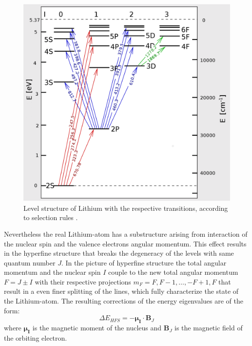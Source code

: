 \begin{figure}[H]
\begin{center}
\includegraphics[scale=.4] {levels2}
\end{center}
\caption{Level structure of Lithium with the respective transitions, according to selection rules \cite{transitions}.}
\label{levels2}
\end{figure}
Nevertheless the real Lithium-atom has a substructure arising from interaction of the nuclear spin and the valence electrons angular momentum. This effect results in the hyperfine structure that breaks the degeneracy of the levels with same quantum number $J$. In the picture of hyperfine structure the total angular momentum and the nuclear spin $I$ couple to the new total angular momentum $F=J\pm I$ with their respective projections $m_F=F,F-1,\dots,-F+1,F$ that result in a even finer splitting of the lines, which fully characterize the state of the Lithium-atom. The resulting corrections of the energy eigenvalues are of the form:
\begin{equation}
\Delta E_{HFS}=-\boldsymbol{\mu_I}\cdot \boldsymbol{B}_J
\end{equation}
where $\boldsymbol{\mu_I}$ is the magnetic moment of the nucleus and $\boldsymbol{B}_J$ is the magnetic field of the orbiting electron.
